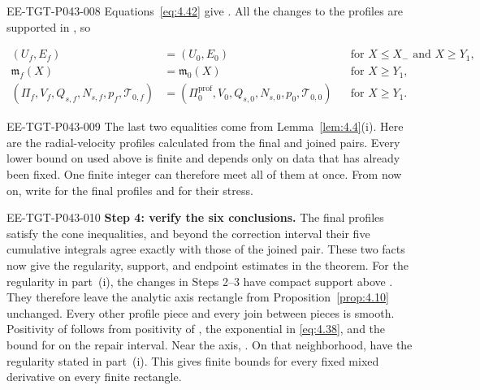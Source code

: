 \begin{EESegment}{EE-TGT-P043-008}
Equations~\eqref{eq:4.42} give
. All the changes to the profiles are
supported in , so
\end{EESegment}
\begin{equation}
\label{eq:4.43}
\begin{aligned}
(U_f,E_f)&=(U_0,E_0) &&\text{for }X\le X_-\text{ and }X\ge Y_1,\\
\mathfrak m_f(X)&=\mathfrak m_0(X) &&\text{for }X\ge Y_1,\\
(\Pi_f,V_f,Q_{s,f},N_{s,f},p_f,\mathcal T_{0,f})
&=(\Pi_0^{\mathrm{prof}},V_0,Q_{s,0},N_{s,0},p_0,
\mathcal T_{0,0})
&&\text{for }X\ge Y_1.
\end{aligned}
\tag{4.43}
\end{equation}
\begin{EESegment}{EE-TGT-P043-009}
The last two equalities come from Lemma~\ref{lem:4.4}\textup{(i)}. Here
 are the radial-velocity profiles calculated from the final
and joined pairs. Every lower bound on  used above is finite and depends
only on data that has already been fixed. One finite integer can therefore meet all of them at
once. From now on, write  for the final profiles and
 for their stress.
\end{EESegment}

\begin{EESegment}{EE-TGT-P043-010}
\textbf{Step 4: verify the six conclusions.} The final profiles satisfy the cone inequalities,
and beyond the correction interval their five cumulative integrals agree exactly with those of the
joined pair. These two facts now give the regularity, support, and endpoint estimates in the
theorem. For the regularity in part~\textup{(i)}, the changes in Steps 2--3 have compact support
above . They therefore leave the analytic axis rectangle from
Proposition~\ref{prop:4.10} unchanged. Every other profile piece and every join between pieces is
smooth. Positivity of  follows from positivity of
, the exponential in \eqref{eq:4.38}, and the bound for
 on the repair interval. Near the axis,
. On that neighborhood,
 have the regularity stated in
part~\textup{(i)}. This gives finite bounds for every fixed mixed derivative on every finite
rectangle.
\end{EESegment}


